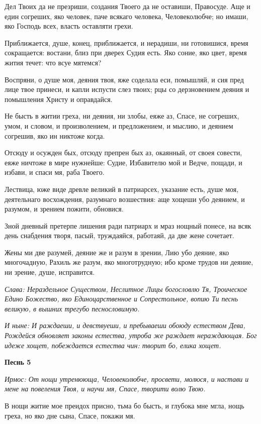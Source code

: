 Дел Твоих да не презриши, создания Твоего да не оставиши, Правосуде. Аще и един согреших, яко человек, паче всякаго человека, Человеколюбче; но имаши, яко Господь всех, власть оставляти грехи. 

Приближается, душе, конец, приближается, и нерадиши, ни готовишися, время сокращается: востани, близ при дверех Судия есть. Яко соние, яко цвет, время жития течет: что всуе мятемся? 

Воспряни, о душе моя, деяния твоя, яже соделала еси, помышляй, и сия пред лице твое принеси, и капли испусти слез твоих; рцы со дерзновением деяния и помышления Христу и оправдайся. 

Не бысть в житии греха, ни деяния, ни злобы, еяже аз, Спасе, не согреших, умом, и словом, и произволением, и предложением, и мыслию, и деянием согрешив, яко ин никтоже когда. 

Отсюду и осужден бых, отсюду препрен бых аз, окаянный, от своея совести, еяже ничтоже в мире нужнейше: Судие, Избавителю мой и Ведче, пощади, и избави, и спаси мя, раба Твоего. 

Лествица, юже виде древле великий в патриарсех, указание есть, душе моя, деятельнаго восхождения, разумнаго возшествия: аще хощеши убо деянием, и разумом, и зрением пожити, обновися. 

Зной дневный претерпе лишения ради патриарх и мраз нощный понесе, на всяк день снабдения творя, пасый, труждаяйся, работаяй, да две жене сочетает. 

Жены ми две разумей, деяние же и разум в зрении, Лию убо деяние, яко многочадную, Рахиль же разум, яко многотрудную; ибо кроме трудов ни деяние, ни зрение, душе, исправится. 

\itshape Слава\normalfont{}: Нераздельное Существом, Неслитное Лицы богословлю Тя, Троическое Едино Божество, яко Единоцарственное и Сопрестольное, вопию Ти песнь великую, в вышних трегубо песнословимую. 

\itshape И ныне\normalfont{}: И раждаеши, и девствуеши, и пребываеши обоюду естеством Дева, Рождейся обновляет законы естества, утроба же раждает нераждающая. Бог идеже хощет, побеждается естества чин: творит бо, елика хощет. 

\medskip\bfseries Песнь 5\normalfont{}

\itshape Ирмос\normalfont{}: От нощи утренююща, Человеколюбче, просвети, молюся, и настави и мене на повеления Твоя, и научи мя, Спасе, творити волю Твою. 

В нощи житие мое преидох присно, тьма бо бысть, и глубока мне мгла, нощь греха, но яко дне сына, Спасе, покажи мя. 

